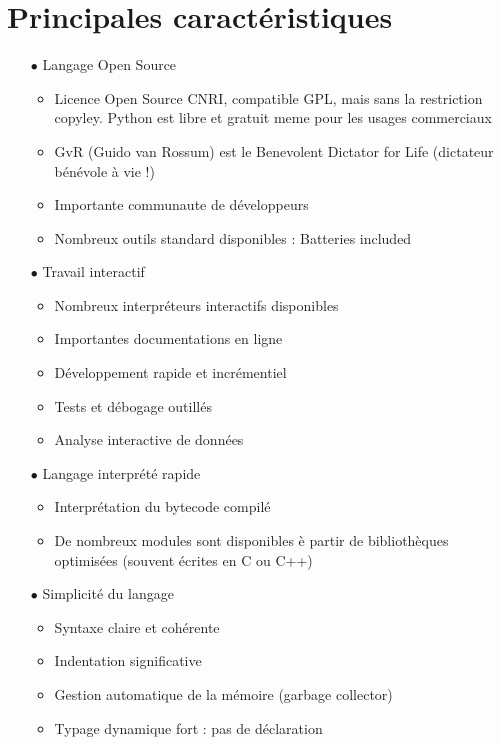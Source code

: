  \section{Principales caractéristiques}
 \begin{itemize}
	
	\item [$\bullet$] Langage Open Source
	
\begin{itemize}
	\item  Licence Open Source CNRI, compatible GPL, mais sans la restriction copyley. Python est libre et
gratuit meme pour les usages commerciaux
\item  GvR (Guido van Rossum) est le  Benevolent Dictator for Life (dictateur bénévole à vie !)
\item  Importante communaute de développeurs
\item  Nombreux outils standard disponibles : Batteries included


\end{itemize}
	\item [$\bullet$] Travail interactif
\begin{itemize}
	\item  Nombreux interpréteurs interactifs disponibles
\item Importantes documentations en ligne
\item Développement rapide et incrémentiel
\item Tests et débogage outillés
\item Analyse interactive de données
	
\end{itemize}
		\item [$\bullet$] Langage interprété rapide
\begin{itemize}
	\item 
 Interprétation du bytecode compilé
\item  De nombreux modules sont disponibles è partir de bibliothèques optimisées (souvent écrites en
C ou C++)
		\end{itemize}

		
			\item [$\bullet$] Simplicité du langage 
\begin{itemize}
	\item Syntaxe claire et cohérente
\item Indentation significative
\item Gestion automatique de la mémoire (garbage collector)
\item Typage dynamique fort : pas de déclaration
			

\end{itemize}
\end{itemize}
